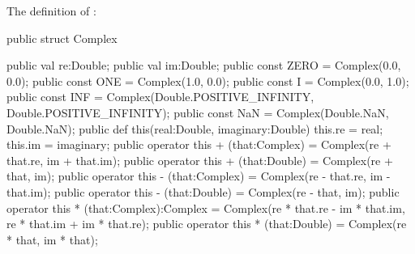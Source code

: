 The definition of :
\begin{xten}
public struct Complex {
    public val re:Double;
    public val im:Double;
    public const ZERO = Complex(0.0, 0.0);
    public const ONE = Complex(1.0, 0.0);
    public const I = Complex(0.0, 1.0);
    public const INF = Complex(Double.POSITIVE_INFINITY,
                               Double.POSITIVE_INFINITY);
    public const NaN = Complex(Double.NaN, Double.NaN);
    public def this(real:Double, imaginary:Double) {
        this.re = real;
        this.im = imaginary;
    }
    public operator this + (that:Complex) =
               Complex(re + that.re, im + that.im);
    public operator this + (that:Double)  =
               Complex(re + that, im);
    public operator this - (that:Complex) =
               Complex(re - that.re, im - that.im);
    public operator this - (that:Double)  =
               Complex(re - that, im);
    public operator this * (that:Complex):Complex =
               Complex(re * that.re - im * that.im,
                       re * that.im + im * that.re);
    public operator this * (that:Double)  =
               Complex(re * that, im * that);

}
\end{xten}
